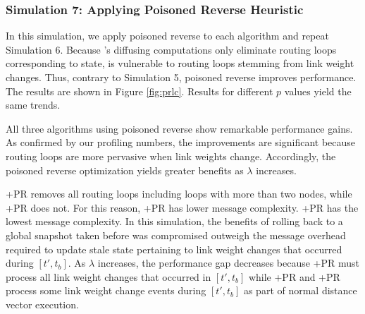 \subsubsection{Simulation 7: Applying Poisoned Reverse Heuristic}
In this simulation, we apply poisoned reverse to each algorithm and repeat Simulation 6. Because \purges's diffusing computations only eliminate routing loops corresponding 
to \badvector state, \purge is vulnerable to routing loops stemming from link weight changes.  Thus, contrary to Simulation 5, poisoned reverse improves \purge performance.
The results are shown in Figure \ref{fig:prlc}. %
Results for different $p$ values yield the same trends. 

All three algorithms using poisoned reverse show remarkable performance gains.
As confirmed by our profiling numbers, the improvements are significant because routing loops are more pervasive when link weights change.  
Accordingly, the poisoned reverse optimization yields greater benefits as $\lambda$ increases. %

\purges+{\textsc PR} removes all routing loops including loops with more than two nodes, while \seconds+{\textsc PR} does not. 
For this reason, \purges+{\textsc PR} has lower message complexity.   %
\cprs+{\textsc PR} has the lowest message complexity. %
In this simulation, the benefits of rolling back to a global snapshot taken before \bad was compromised outweigh the message overhead required to update stale state pertaining to 
link weight changes that occurred during $[t',t_b]$. As $\lambda$ increases,
the performance gap decreases because \cprs+{\textsc PR} must process all link weight changes that occurred in $[t',t_b]$ while \seconds+{\textsc PR}  and \purges+{\textsc PR}
process some link weight change events during $[t',t_b]$ as part of normal distance vector execution.

